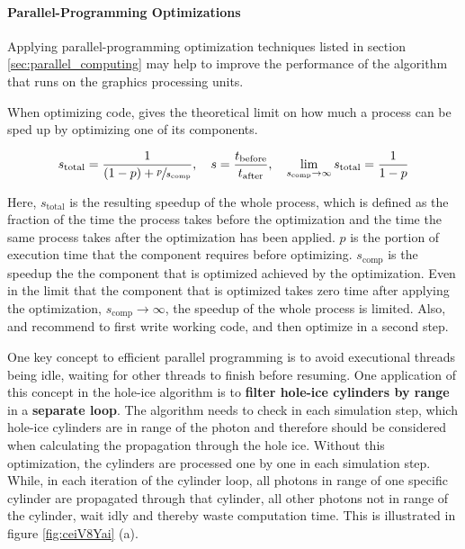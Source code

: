\paragraph{Parallel-Programming Optimizations}
Applying parallel-programming optimization techniques listed in section \ref{sec:parallel_computing} may help to improve the performance of the algorithm that runs on the graphics processing units.

When optimizing code,  gives the theoretical limit on how much a process can be sped up by optimizing one of its components. \cite{raytracingtips}

$$ s_\text{total} = \frac{1}{(1 - p) + \sfrac{p}{s_\text{comp}}}, \ \ \ s = \frac{t_\text{before}}{t_\text{after}}, \ \ \
\lim_{s_\text{comp}\rightarrow\infty} s_\text{total} = \frac{1}{1-p} $$

Here, $s_\text{total}$ is the resulting speedup of the whole process, which is defined as the fraction of the time the process takes before the optimization and the time the same process takes after the optimization has been applied. $p$ is the portion of execution time that the component requires before optimizing. $s_\text{comp}$ is the speedup the the component that is optimized achieved by the optimization.
Even in the limit that the component that is optimized takes zero time after applying the optimization, $s_\text{comp}\rightarrow\infty$, the speedup of the whole process is limited.
Also, \authorname{House} and \authorname{Wyman} \cite{raytracingtips} recommend to first write working code, and then optimize in a second step.

One key concept to efficient parallel programming is to avoid executional threads being idle, waiting for other threads to finish before resuming.
One application of this concept in the hole-ice algorithm is to \textbf{filter hole-ice cylinders by range} in a \textbf{separate loop}.
The algorithm needs to check in each simulation step, which hole-ice cylinders are in range of the photon and therefore should be considered when calculating the propagation through the hole ice. Without this optimization, the cylinders are processed one by one in each simulation step. While, in each iteration of the cylinder loop, all photons in range of one specific cylinder are propagated through that cylinder, all other photons not in range of the cylinder, wait idly and thereby waste computation time. This is illustrated in figure \ref{fig:ceiV8Yai} (a).

